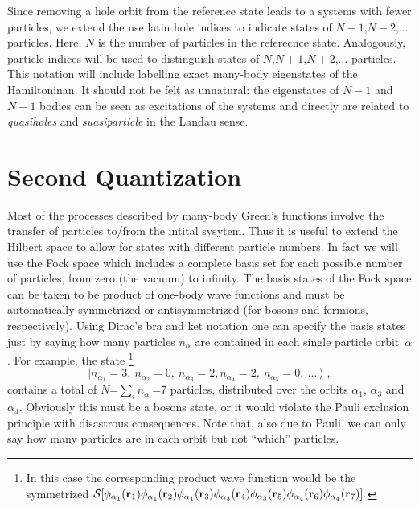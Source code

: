 Since removing a hole orbit from the reference state leads to a systems with fewer particles, we extend the use latin hole indices to indicate states of $N-1$,$N-2$,$\ldots$ particles. Here, $N$ is the number of particles in the referecnce state.
Analogously, particle indices will be used to distinguish states of $N$,$N+1$,$N+2$,$\ldots$ particles.
 This notation will include labelling exact many-body eigenstates of the Hamiltoninan. It should not be felt as unnatural: the eigenstates of $N-1$ and $N+1$ bodies can be seen as excitations of the systems and directly are related to {\em quasiholes} and {\em suasiparticle} in the Landau sense.


\section{Second Quantization}


Most of the processes described by many-body Green's functions involve the transfer of particles to/from the intital sysytem. Thus it is useful to extend the Hilbert space to allow for states with different particle numbers. In fact we will use the Fock space which includes a complete basis set for each possible number of particles, from zero (the vacuum) to infinity.
%
The basis states of the Fock space can be taken to be product of one-body wave functions and must be automatically symmetrized or antisymmetrized (for bosons and fermions, respectively).
Using Dirac's bra and ket notation one can specify the basis states just by saying how many particles $n_\alpha$ are contained in each single particle orbit~$\alpha$. For example, the state%
\footnote{In this case the corresponding product wave function would be the symmetrized
${\cal S}[\phi_{\alpha_1}({\bf r}_1)\phi_{\alpha_1}({\bf r}_2)\phi_{\alpha_1}({\bf r}_3)
          \phi_{\alpha_3}({\bf r}_4)\phi_{\alpha_3}({\bf r}_5)\phi_{\alpha_4}({\bf r}_6)\phi_{\alpha_4}({\bf r}_7)].$}
\begin{equation}
 \vert  n_{\alpha_1}=3, ~ n_{\alpha_2}=0, ~ n_{\alpha_3}=2,
        n_{\alpha_4}=2, ~ n_{\alpha_5}=0, ~ \ldots ~ \rangle \; ,
\end{equation}
contains a total of $N$=$\sum_i n_{\alpha_i}$=7 particles, distributed over the orbits $\alpha_1$,  $\alpha_3$ and $\alpha_4$. Obviously this must be a bosons state, or it would violate the Pauli exclusion principle with disastrous consequences. Note that, also due to Pauli, we can only say how many particles are in each orbit but not ``which'' particles.

